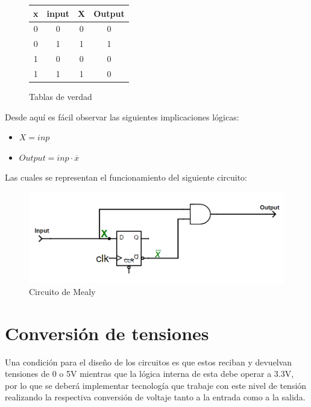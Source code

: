 \begin{figure}[H]
\begin{centering}
\begin{tabular}{|c|c||c|c|}
\hline 
x & input & X & Output\tabularnewline
\hline 
\hline 
0 & 0 & 0 & 0\tabularnewline
\hline 
0 & 1 & 1 & 1\tabularnewline
\hline 
1 & 0 & 0 & 0\tabularnewline
\hline 
1 & 1 & 1 & 0\tabularnewline
\hline 
\end{tabular}
\par\end{centering}
\caption{Tablas de verdad}

\end{figure}

Desde aquí es fácil observar las siguientes implicaciones lógicas:\\
\begin{itemize}
\item $X=inp$
\item $Output=inp\cdot\overline{x}$
\end{itemize}
Las cuales se representan el funcionamiento del siguiente circuito:\\

\begin{figure}[H]
\begin{centering}
\includegraphics[scale=0.8]{../Ejercicio-3/imagenes/E3-TP3-Mealy.png}
\par\end{centering}
\caption{Circuito de Mealy}

\end{figure}


\section{Conversión de tensiones}

Una condición para el diseño de los circuitos es que estos reciban y devuelvan tensiones de 0 o 5V mientras que la lógica interna de esta debe operar a 3.3V, por lo que se deberá implementar tecnología que trabaje con este nivel de tensión realizando la respectiva conversión de voltaje tanto a la entrada como a la salida.\\

